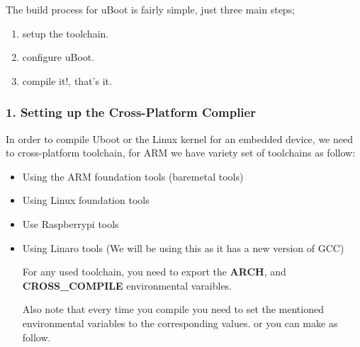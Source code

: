 \documentclass{article}
\begin{document}
The build process for uBoot is fairly simple, just three main steps;
\begin{enumerate}
    \item setup the toolchain. 
    \item configure uBoot.
    \item compile it!, that's it.
\end{enumerate}


\subsubsection{1. Setting up the Cross-Platform Complier}
In order to compile Uboot or the Linux kernel for an embedded device, we need to cross-platform toolchain, for ARM we have variety set of toolchains as follow:
\begin{itemize}
    \item Using the ARM foundation tools (baremetal tools)
    

    \item Using Linux foundation tools
    

    \item Use Raspberrypi tools
    

    \item Using Linaro tools (We will be using this as it has a new version of GCC) 
    

    For any used toolchain, you need to export the \textbf{ARCH}, and \textbf{CROSS\_COMPILE} environmental varaibles.
    

    Also note that every time you compile you need to set the mentioned environmental variables to the corresponding values. or you can make as follow.
    

\end{itemize}
\end{document}
